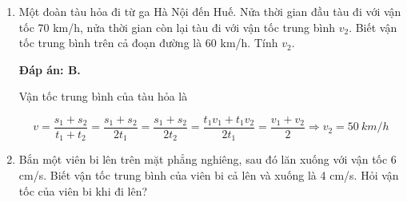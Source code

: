 \begin{enumerate}[label=\bfseries Câu \arabic*:]
	
	{Một ô tô đi từ Huế vào Đà Nẵng với vận tốc trung bình 48 km/h. Nửa thời gian đầu ô tô có vận tốc trung bình là 40 km/h. Nửa thời sau ô tô có vận tốc trung bình là
		
		
	}
	
	\hideall
	{\textbf{Đáp án: B.}
		
		Vận tốc trung bình của ô tô là
		
		$$v=\dfrac{s_1+s_2}{t_1+t_2} = \dfrac{s_1+s_2}{2t_1} = \dfrac{s_1+s_2}{2t_2} = \dfrac{t_1v_1+t_1v_2}{2t_1} = \dfrac{v_1+v_2}{2} \Rightarrow v_1 = \SI{56}{km/h}$$
	}
	\item {}
	
	
	{Một đoàn tàu hỏa đi từ ga Hà Nội đến Huế. Nửa thời gian đầu tàu đi với vận tốc 70 km/h, nửa thời gian còn lại tàu đi với vận tốc trung bình $v_2$. Biết vận tốc trung bình trên cả đoạn đường là 60 km/h. Tính $v_2$.
		
		
	}
	
	\hideall
	{\textbf{Đáp án: B.}
		
		Vận tốc trung bình của tàu hỏa là
		
		$$v=\dfrac{s_1+s_2}{t_1+t_2} = \dfrac{s_1+s_2}{2t_1} = \dfrac{s_1+s_2}{2t_2} = \dfrac{t_1v_1+t_1v_2}{2t_1} = \dfrac{v_1+v_2}{2} \Rightarrow v_2 = \SI{50}{km/h}$$
	}
	\item {}
	
	
	{Bắn một viên bi lên trên mặt phẳng nghiêng, sau đó lăn xuống với vận tốc 6 cm/s. Biết vận tốc trung bình của viên bi cả lên và xuống là 4 cm/s. Hỏi vận tốc của viên bi khi đi lên?
		
		
}
\end{enumerate}
